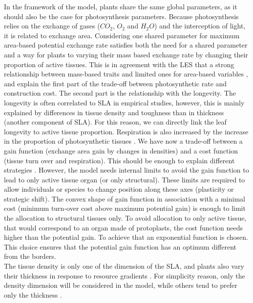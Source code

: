 In the framework of the model, plants share the same global parameters, as it should also be the case for photosynthesis parameters. Because photosynthesis relies on the exchange of gases ($CO_2$, $O_2$ and $H_2O$) and the interception of light, it is related to exchange area. Considering one shared parameter for maximum area-based potential exchange rate satisfies both the need for a shared parameter and a way for plants to varying their mass based exchange rate by changing their proportion of active tissues. This is in agreement with the LES that a strong relationship between mass-based traits and limited ones for area-based variables \parencite{wright_worldwide_2004}, and explain the first part of the trade-off between photosynthetic rate and construction cost. The second part is the relationship with the longevity. The longevity is often correlated to SLA in empirical studies, however, this is mainly explained by differences in tissue density and toughness than in thickness (another component of SLA). For this reason, we can directly link the leaf longevity to active tissue proportion. Respiration is also increased by the increase in the proportion of photosynthetic tissues \parencite{kleidon_global_2000, reich_world-wide_2014}. We have now a trade-off between a gain function (exchange area gain by changes in densities) and a cost function (tissue turn over and respiration). This should be enough to explain different strategies \cite{westoby_leaf-height-seed_1998}. However, the model needs internal limits to avoid the gain function to lead to only active tissue organ (or only structural). These limits are required to allow individuals or species to change position along these axes (plasticity or strategic shift). The convex shape of gain function in association with a minimal cost (minimum turn-over cost above maximum potential gain) is enough to limit the allocation to structural tissues only. To avoid allocation to only active tissue, that would correspond to an organ made of protoplasts, the cost function needs higher than the potential gain. To achieve that an exponential function is chosen. This choice ensures that the potential gain function has an optimum different from the borders.\\


The tissue density is only one of the dimension of the SLA, and plants also vary their thickness in response to resource gradients \parencite{poorter_causes_2009}. For simplicity reason, only the density dimension will be considered in the model, while others tend to prefer only the thickness \parencite{feller_mathematical_2015}.



